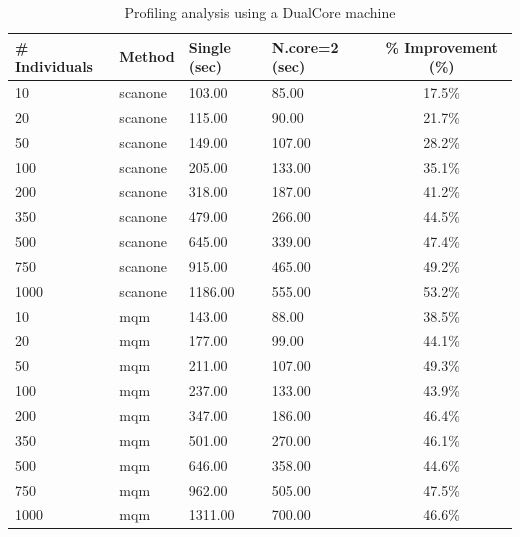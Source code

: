 \begin{table}[ht]
	\caption{Profiling analysis using a DualCore machine}
	\centering
	\begin{tabular}{| l | l | l | l | c |}
	\hline
	\# Individuals &	Method &	Single (sec) &	N.core=2 (sec) & \% Improvement (\%) \\
	\hline
	\hline
	10	& scanone &	103.00 &	85.00 &	17.5\%\\
	20	& scanone &	115.00&	90.00&	21.7\%\\
	50	& scanone &	149.00&	107.00&	28.2\%\\
	100	& scanone &	205.00&	133.00&	35.1\%\\
	200	& scanone &	318.00&	187.00&	41.2\%\\
	350	& scanone &	479.00&	266.00&	44.5\%\\
	500	& scanone &	645.00&	339.00&	47.4\%\\
	750	& scanone &	915.00&	465.00&	49.2\%\\
	1000 & scanone &	1186.00&	555.00&	53.2\%\\
	\hline
	10	&mqm&	143.00&	88.00&	38.5\%\\
	20	&mqm&	177.00&	99.00&	44.1\%\\
	50	&mqm&	211.00&	107.00&	49.3\%\\
	100	&mqm&	237.00&	133.00&	43.9\%\\
	200	&mqm&	347.00&	186.00&	46.4\%\\
	350 &mqm&	501.00&	270.00&	46.1\%\\
	500	&mqm&	646.00&	358.00&	44.6\%\\
	750	&mqm&	962.00&	505.00&	47.5\%\\
	1000 &mqm&	1311.00&	700.00&	46.6\%\\
	\hline
	\end{tabular}
	\label{tbl:tabel2}
\end{table}

